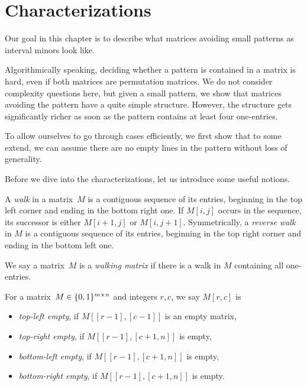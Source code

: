 \newsavebox{\smlmat}
\savebox{\smlmat}{$\smm{\bullet&\bullet\\\bullet& }$}
\newsavebox{\smlmatb}
\savebox{\smlmatb}{$\smm{\bullet&\bullet\\\bullet&\bullet}$}
\newsavebox{\smlmatc}
\savebox{\smlmatc}{$\smm{\bullet&\bullet&\bullet\\ &\bullet& }$}

\chapter{Characterizations}
\label{chap:chars}
Our goal in this chapter is to describe what matrices avoiding small patterns as interval minors look like.

Algorithmically speaking, deciding whether a pattern is contained in a matrix is hard, even if both matrices are permutation matrices. We do not consider complexity questions here, but given a small pattern, we show that matrices avoiding the pattern have a quite simple structure. However, the structure gets significantly richer as soon as the pattern contains at least four one-entries.

To allow ourselves to go through cases efficiently, we first show that to some extend, we can assume there are no empty lines in the pattern without loss of generality.

Before we dive into the characterizations, let us introduce some useful notions.

\begin{defn}
A \emph{walk} in a matrix~$M$ is a contiguous sequence of its entries, beginning in the top left corner and ending in the bottom right one. If $M[i,j]$ occurs in the sequence, its successor is either $M[i+1,j]$ or $M[i,j+1]$. Symmetrically, a \emph{reverse walk} in $M$ is a contiguous sequence of its entries, beginning in the top right corner and ending in the bottom left one.
\end{defn}

\begin{defn}
We say a matrix~$M$ is a \emph{walking matrix} if there is a walk in $M$ containing all one-entries.
\end{defn}

\begin{defn}
For a matrix~$M\in\{0,1\}^{m\times n}$ and integers $r,c$, we say $M[r,c]$ is
\begin{itemize}
	\item \emph{top-left empty}, if $M[[r-1],[c-1]]$ is an empty matrix,
	\item \emph{top-right empty}, if $M[[r-1],[c+1,n]]$ is empty,
	\item \emph{bottom-left empty}, if $M[[r-1],[c+1,n]]$ is empty,
	\item \emph{bottom-right empty}, if $M[[r-1],[c+1,n]]$ is empty.
\end{itemize}
\end{defn}

